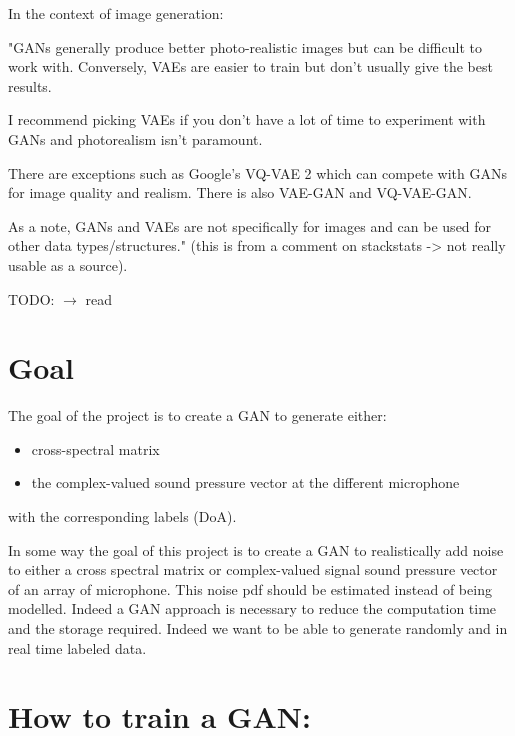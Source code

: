 \documentclass{article}
\begin{document}
In the context of image generation:

"GANs generally produce better photo-realistic images but can be difficult to work with. Conversely, VAEs are easier to train but don’t usually give the best results.

I recommend picking VAEs if you don’t have a lot of time to experiment with GANs and photorealism isn’t paramount.

There are exceptions such as Google’s VQ-VAE 2 which can compete with GANs for image quality and realism. There is also VAE-GAN and VQ-VAE-GAN.

As a note, GANs and VAEs are not specifically for images and can be used for other data types/structures." (this is from a comment on stackstats -> not really usable as a source).

TODO: $\rightarrow$ read \cite{10.1007/978-3-030-38961-1_8}



\section{Goal}

The goal of the project is to create a GAN to generate either:
\begin{itemize}
    \item cross-spectral matrix
    \item the complex-valued sound pressure vector at the different microphone
\end{itemize}
with the corresponding labels (DoA).

In some way the goal of this project is to create a GAN to realistically add noise to either a cross spectral matrix or complex-valued signal sound pressure vector of an array of microphone. This noise pdf should be estimated instead of being modelled. Indeed a GAN approach is necessary to reduce the computation time and the storage required. Indeed we want to be able to generate randomly and in real time labeled data.  

\section{How to train a GAN:}
\end{document}
